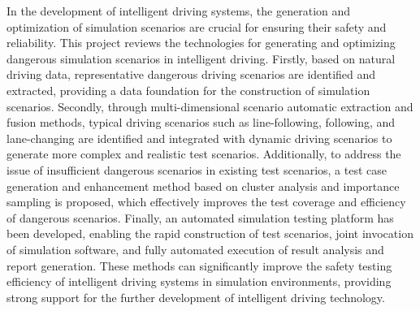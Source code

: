 \begin{abstracten}

In the development of intelligent driving systems, the generation and optimization of simulation scenarios are crucial for ensuring their safety and reliability. This project reviews the technologies for generating and optimizing dangerous simulation scenarios in intelligent driving. Firstly, based on natural driving data, representative dangerous driving scenarios are identified and extracted, providing a data foundation for the construction of simulation scenarios. Secondly, through multi-dimensional scenario automatic extraction and fusion methods, typical driving scenarios such as line-following, following, and lane-changing are identified and integrated with dynamic driving scenarios to generate more complex and realistic test scenarios. Additionally, to address the issue of insufficient dangerous scenarios in existing test scenarios, a test case generation and enhancement method based on cluster analysis and importance sampling is proposed, which effectively improves the test coverage and efficiency of dangerous scenarios. Finally, an automated simulation testing platform has been developed, enabling the rapid construction of test scenarios, joint invocation of simulation software, and fully automated execution of result analysis and report generation. These methods can significantly improve the safety testing efficiency of intelligent driving systems in simulation environments, providing strong support for the further development of intelligent driving technology.



\end{abstracten}